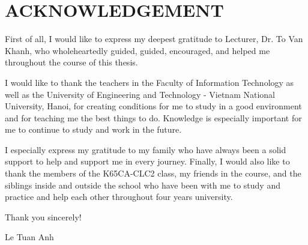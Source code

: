 \chapter*{ACKNOWLEDGEMENT}
\fontsize{13}{15}\selectfont

First of all, I would like to express my deepest gratitude to Lecturer, Dr. To Van Khanh, who wholeheartedly guided, guided, encouraged, and helped me throughout the course of this thesis.

I would like to thank the teachers in the Faculty of Information Technology as well as the University of Engineering and Technology - Vietnam National University, Hanoi, for creating conditions for me to study in a good environment and for teaching me the best things to do. Knowledge is especially important for me to continue to study and work in the future.

I especially express my gratitude to my family who have always been a solid support to help and support me in every journey.
Finally, I would also like to thank the members of the K65CA-CLC2 class, my friends in the course, and the siblings inside and outside the school who have been with me to study and practice and help each other throughout four years university.

Thank you sincerely!


\vspace{2cm}
\begin{flushright}
    Le Tuan Anh\hspace*{1.3cm}
\end{flushright}